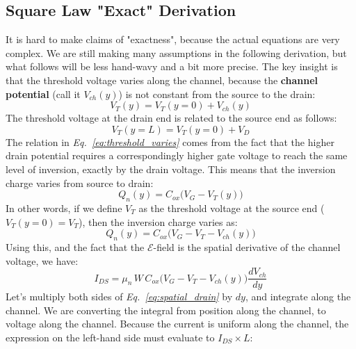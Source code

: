 \subsection{Square Law "Exact" Derivation}
It is hard to make claims of "exactness", because the actual equations are very complex.  We are still making many assumptions in the following derivation, but what follows will be less hand-wavy and a bit more precise.  The key insight is that the threshold voltage varies along the channel, because the \textbf{channel potential} (call it $V_{ch}(y)$) is not constant from the source to the drain:
    \begin{equation} 
        V_T(y) = V_T(y=0) + V_{ch}(y)
    \end{equation}
The threshold voltage at the drain end is related to the source end as follows:
    \begin{equation} 
        V_T(y=L) = V_T(y=0) + V_D
        \label{eq:threshold_varies}
    \end{equation} 
The relation in \emph{Eq.~\ref{eq:threshold_varies}} comes from the fact that the higher drain potential requires a correspondingly higher gate voltage to reach the same level of inversion, exactly by the drain voltage.  This means that the inversion charge varies from source to drain:
    \begin{equation} 
        Q_n(y) = C_{ox} \big(V_G - V_T(y)\big)
    \end{equation}
In other words, if we define $V_T$ as the threshold voltage at the source end ($V_T(y=0) = V_{T}$), then the inversion charge varies as:
    \begin{equation} 
        Q_n(y) = C_{ox} \big(V_G - V_T - V_{ch}(y)\big)
        \label{eq:invcharge}
    \end{equation}
Using this, and the fact that the $\mathcal{E}$-field is the spatial derivative of the channel voltage, we have:
    \begin{equation} 
        I_{DS} = \mu_n\,W\,C_{ox} \big(V_G - V_T - V_{ch}(y) \big) \frac{dV_{ch}}{dy}
        \label{eq:spatial_drain}
    \end{equation}
Let's multiply both sides of \emph{Eq.~\ref{eq:spatial_drain}} by $dy$, and integrate along the channel.  We are converting the integral from position along the channel, to voltage along the channel.  Because the current is uniform along the channel, the expression on the left-hand side must evaluate to $I_{DS} \times L$:
